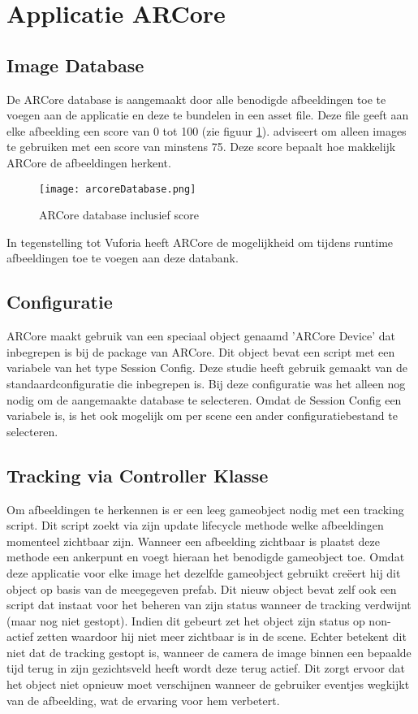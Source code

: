 \section{Applicatie ARCore}

\subsection{Image Database}
De ARCore database is aangemaakt door alle benodigde afbeeldingen toe te voegen aan de applicatie en deze te bundelen in een asset file. Deze file geeft aan elke afbeelding een score van 0 tot 100 (zie figuur \ref{fig:arcoreDatabase}). \textcite{GoogleImages} adviseert om alleen images te gebruiken met een score van minstens 75. Deze score bepaalt hoe makkelijk ARCore de afbeeldingen herkent.

\begin{figure}
    \texttt{[image: arcoreDatabase.png]}
    \caption{ARCore database inclusief score}
    \label{fig:arcoreDatabase}
\end{figure}

In tegenstelling tot Vuforia heeft ARCore de mogelijkheid om tijdens runtime afbeeldingen toe te voegen aan deze databank.

\subsection{Configuratie}
ARCore maakt gebruik van een speciaal object genaamd 'ARCore Device' dat inbegrepen is bij de package van ARCore. Dit object bevat een script met een variabele van het type Session Config. Deze studie heeft gebruik gemaakt van de standaardconfiguratie die inbegrepen is. Bij deze configuratie was het alleen nog nodig om de aangemaakte database te selecteren.
Omdat de Session Config een variabele is, is het ook mogelijk om per scene een ander configuratiebestand te selecteren.

\subsection{Tracking via Controller Klasse}
Om afbeeldingen te herkennen is er een leeg gameobject nodig met een tracking script. Dit script zoekt via zijn update lifecycle methode welke afbeeldingen momenteel zichtbaar zijn. Wanneer een afbeelding zichtbaar is plaatst deze methode een ankerpunt en voegt hieraan het benodigde gameobject toe. Omdat deze applicatie voor elke image het dezelfde gameobject gebruikt creëert hij dit object op basis van de meegegeven prefab. Dit nieuw object bevat zelf ook een script dat instaat voor het beheren van zijn status wanneer de tracking verdwijnt (maar nog niet gestopt). Indien dit gebeurt zet het object zijn status op non-actief zetten waardoor hij niet meer zichtbaar is in de scene. Echter betekent dit niet dat de tracking gestopt is, wanneer de camera de image binnen een bepaalde tijd terug in zijn gezichtsveld heeft wordt deze terug actief. Dit zorgt ervoor dat het object niet opnieuw moet verschijnen wanneer de gebruiker eventjes wegkijkt van de afbeelding, wat de ervaring voor hem verbetert.

